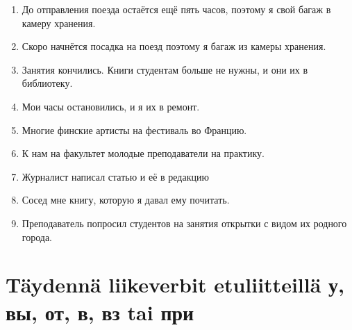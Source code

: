 \documentclass[paper=a4, fontsize=11pt]{scrartcl}
\begin{document}
\begin{enumerate}
    \item До отправления поезда остаётся ещё пять часов, поэтому я \raisebox{-0.1cm}{\shortstack{\underline{\hspace{3cm}}}} свой багаж в камеру хранения.
    \item Скоро начнётся посадка  на поезд поэтому я \raisebox{-0.1cm}{\shortstack{\underline{\hspace{3cm}}}} багаж из камеры хранения.
    \item Занятия кончились. Книги студентам больше не нужны, и они \raisebox{-0.1cm}{\shortstack{\underline{\hspace{3cm}}}} их в библиотеку. 
    \item Мои часы остановились, и я \raisebox{-0.1cm}{\shortstack{\underline{\hspace{3cm}}}} их в ремонт. 
    \item Многие финские артисты \raisebox{-0.1cm}{\shortstack{\underline{\hspace{3cm}}}} на фестиваль во Францию.
    \item К нам на факультет \raisebox{-0.1cm}{\shortstack{\underline{\hspace{3cm}}}}  молодые преподаватели на практику.
    \item Журналист написал статью и \raisebox{-0.1cm}{\shortstack{\underline{\hspace{3cm}}}} её в редакцию
    \item Сосед \raisebox{-0.1cm}{\shortstack{\underline{\hspace{3cm}}}} мне книгу, которую я давал ему почитать. 
    \item Преподаватель попросил студентов \raisebox{-0.1cm}{\shortstack{\underline{\hspace{3cm}}}} на занятия открытки с видом их родного города. 
\end{enumerate}

\section{Täydennä liikeverbit etuliitteillä у, вы, от, в, вз tai при}
\end{document}
